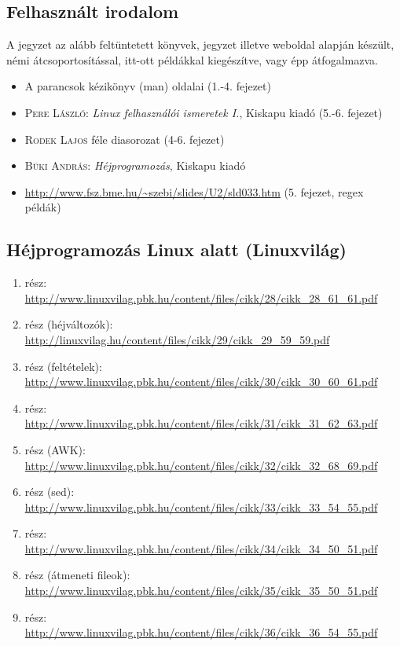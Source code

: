 
\subsection*{Felhasznált irodalom}
A jegyzet az alább feltüntetett könyvek, jegyzet illetve weboldal alapján készült, némi átcsoportosítással, 
itt-ott példákkal kiegészítve, vagy  épp átfogalmazva. 
\pagestyle{empty}
\begin{itemize}
\item A parancsok kézikönyv (man) oldalai (1.-4. fejezet)
\item \textsc{Pere László:} \textit{Linux felhasználói ismeretek I.}, Kiskapu kiadó (5.-6. fejezet)
\item \textsc{Rodek Lajos} féle diasorozat (4-6. fejezet)
\item \textsc{Büki András}: \textit{Héjprogramozás}, Kiskapu kiadó
\item \url{http://www.fsz.bme.hu/~szebi/slides/U2/sld033.htm} (5. fejezet, regex példák)
\end{itemize}

\subsection*{Héjprogramozás Linux alatt (Linuxvilág)}
    \begin{enumerate}
    \item rész: \url{http://www.linuxvilag.pbk.hu/content/files/cikk/28/cikk_28_61_61.pdf}
    \item rész (héjváltozók): \url{http://linuxvilag.hu/content/files/cikk/29/cikk_29_59_59.pdf} 
    \item rész (feltételek): \url{http://www.linuxvilag.pbk.hu/content/files/cikk/30/cikk_30_60_61.pdf}
    \item rész: \url{http://www.linuxvilag.pbk.hu/content/files/cikk/31/cikk_31_62_63.pdf}
    \item rész (AWK): \url{http://www.linuxvilag.pbk.hu/content/files/cikk/32/cikk_32_68_69.pdf}
    \item rész (sed): \url{http://www.linuxvilag.pbk.hu/content/files/cikk/33/cikk_33_54_55.pdf} 
    \item rész: \url{http://www.linuxvilag.pbk.hu/content/files/cikk/34/cikk_34_50_51.pdf}
    \item rész (átmeneti fileok): \url{http://www.linuxvilag.pbk.hu/content/files/cikk/35/cikk_35_50_51.pdf}
    \item rész: \url{http://www.linuxvilag.pbk.hu/content/files/cikk/36/cikk_36_54_55.pdf}
    \end{enumerate}
